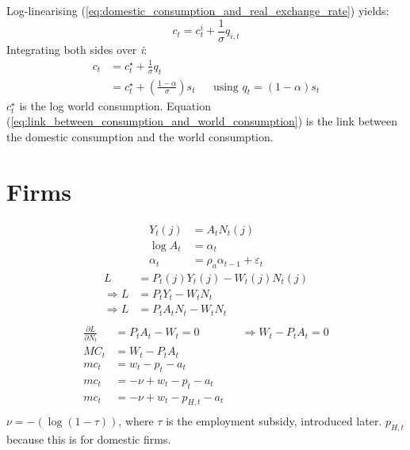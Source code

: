 \documentclass[12pt]{article}
\begin{document}
Log-linearising (\ref{eq:domestic_consumption_and_real_exchange_rate}) yields:
\begin{equation}
    c_t = c_{t}^i + \frac{1}{\sigma}q_{i,t}
\end{equation}
Integrating both sides over \textit{i}:
\begin{align}
    c_t & = c_t^{\star} + \frac{1}{\sigma}q_t                                                                               &  &                                  \\
        & = c_t^{\star} + \left(\frac{1-\alpha}{\sigma}\right)s_t \label{eq:link_between_consumption_and_world_consumption} &  & \text{using $q_t=(1-\alpha)s_t$}
\end{align}
$c_t^{\star}$ is the log world consumption. Equation (\ref{eq:link_between_consumption_and_world_consumption}) is the link between the domestic consumption and the world consumption.
\section{Firms}
\begin{align}
    Y_t(j)   & = A_t N_t(j)                          \\
    \log A_t & = \alpha_t                            \\
    \alpha_t & = \rho_a \alpha_{t-1} + \varepsilon_t
\end{align}
\begin{align}
    L             & =P_{t}(j)Y_{t}(j) - W_t(j)N_{t}(j) \\
    \Rightarrow L & =P_{t}Y_{t} - W_tN_{t}             \\
    \Rightarrow L & =P_{t}A_t N_t - W_tN_{t}           \\
\end{align}
\begin{align}
    \frac{\partial L}{\partial N_t} & = P_t A_t - W_t = 0          &  & \Rightarrow W_t - P_tA_t = 0 \\
    MC_t                            & = W_t - P_tA_t                                                 \\
    mc_t                            & = w_t - p_t - a_t                                              \\
    mc_t                            & = -\nu + w_t - p_t - a_t                                       \\
    mc_t                            & = -\nu + w_t - p_{H,t} - a_t                                   \\
\end{align}
$\nu=-(\log (1-\tau))$, where $\tau$ is the employment subsidy, introduced later. $p_{H,t}$ because this is for domestic firms.
\end{document}
